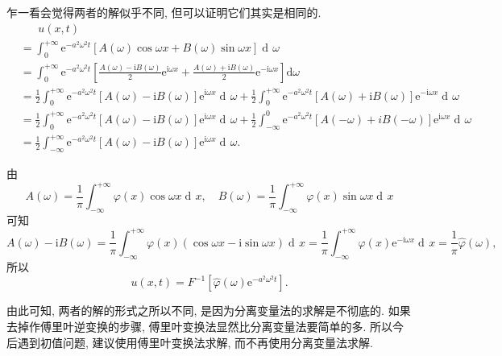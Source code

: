 \documentclass[aspectratio=169,notheorems,12pt,compress,UTF8]{ctexbeamer} %
\DeclareMathOperator\dif{d\!}
\newcommand{\me}{\mathrm{e}}
\newcommand{\mi}{\mathrm{i}}
\begin{document}
\begin{frame}
乍一看会觉得两者的解似乎不同, 但可以证明它们其实是相同的. \pause
\begin{align*}
&\phantom{=\;}u(x,t)\\
&=\int_{0}^{+\infty}\me^{-a^2\omega^2t}[A(\omega)\cos\omega
x+B(\omega)\sin\omega x]\dif\omega\\ &=
\int_{0}^{+\infty}\me^{-a^2\omega^2t}\left[\frac{A(\omega)-\mi B(\omega)}{2}\me^{\mi\omega
x}+\frac{A(\omega)+\mi B(\omega)}{2}\me^{-\mi\omega x}\right]\mathrm{d}\omega\\
&=\frac{1}{2}\int_0^{+\infty}\me^{-a^2\omega^2t}[A(\omega)-\mi B(\omega)]\me^{\mi \omega x}\dif\omega+
\frac{1}{2}\int_0^{+\infty}\me^{-a^2\omega^2t}[A(\omega)+\mi B(\omega)]\me^{-\mi \omega x}\dif\omega \\
&=\frac{1}{2}\int_0^{+\infty}\me^{-a^2\omega^2t}[A(\omega)-\mi B(\omega)]\me^{\mi \omega x}\dif\omega+
\frac{1}{2}\int_{-\infty}^0\me^{-a^2\omega^2t}[A(-\omega)+iB(-\omega)]\me^{\mi \omega x}\dif\omega \\
&=\frac{1}{2}\int_{-\infty}^{+\infty}\me^{-a^2\omega^2t}\left[A(\omega)-\mi B(\omega)\right]\me^{\mi\omega
x}\dif\omega.
\end{align*}
\end{frame}

\begin{frame}
由
\begin{equation*}
A(\omega)=\frac{1}{\pi} \int_{-\infty}^{+\infty}
\varphi(x)\cos\omega x \dif x,\quad B(\omega)=\frac{1}{\pi}
\int_{-\infty}^{+\infty} \varphi(x)\sin\omega x \dif x
\end{equation*}
可知
\begin{equation*}
A(\omega)-\mi B(\omega)=\frac{1}{\pi} \int_{-\infty}^{+\infty}
\varphi(x)(\cos\omega x-\mi\sin\omega x) \dif x=\frac{1}{\pi}\int_{-\infty}^{+\infty}
\varphi(x)\me^{-\mi\omega x}\dif x=\frac{1}{\pi}\widehat{\varphi}(\omega),
\end{equation*}
所以
\begin{equation*}
u(x,t)= F^{-1}[\widehat{\varphi}(\omega)\me^{-a^2\omega^2t}].
\end{equation*}\pause

\qquad 由此可知, 两者的解的形式之所以不同, 是因为分离变量法的求解是不彻底的. \pause
如果去掉作傅里叶逆变换的步骤, 傅里叶变换法显然比分离变量法要简单的多.
所以今后{\heiti 遇到初值问题, 建议使用傅里叶变换法求解, 而不再使用分离变量法求解}.
\end{frame}
\end{document}
